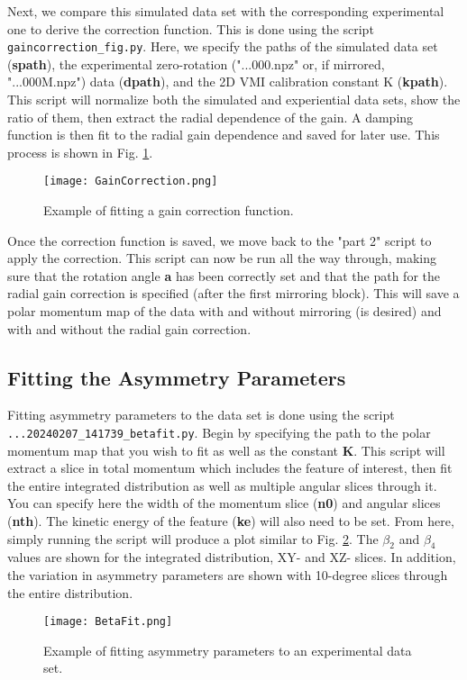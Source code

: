 \documentclass[12pt]{article}
\begin{document}
Next, we compare this simulated data set with the corresponding experimental one to derive the correction function.
This is done using the script \texttt{gaincorrection\_fig.py}.
Here, we specify the paths of the simulated data set (\textbf{spath}), the experimental zero-rotation ("...000.npz" or, if mirrored, "...000M.npz") data (\textbf{dpath}), and the 2D VMI calibration constant K (\textbf{kpath}).
This script will normalize both the simulated and experiential data sets, show the ratio of them, then extract the radial dependence of the gain.
A damping function is then fit to the radial gain dependence and saved for later use.
This process is shown in Fig. \ref{fig:GainCorrection}.

\begin{figure}
\centering
\texttt{[image: GainCorrection.png]}
\caption{
Example of fitting a gain correction function.
}\label{fig:GainCorrection}
\end{figure}

Once the correction function is saved, we move back to the "part 2" script to apply the correction.
This script can now be run all the way through, making sure that the rotation angle \textbf{a} has been correctly set and that the path for the radial gain correction is specified (after the first mirroring block).
This will save a polar momentum map of the data with and without mirroring (is desired) and with and without the radial gain correction.

\subsection{Fitting the Asymmetry Parameters}

Fitting asymmetry parameters to the data set is done using the script \texttt{...20240207\_141739\_betafit.py}.
Begin by specifying the path to the polar momentum map that you wish to fit as well as the constant \textbf{K}.
This script will extract a slice in total momentum which includes the feature of interest, then fit the entire integrated distribution as well as multiple angular slices through it.
You can specify here the width of the momentum slice (\textbf{n0}) and angular slices (\textbf{nth}).
The kinetic energy of the feature (\textbf{ke}) will also need to be set.
From here, simply running the script will produce a plot similar to Fig. \ref{fig:BetaFit}.
The $\beta_2$ and $\beta_4$ values are shown for the integrated distribution, XY- and XZ- slices.
In addition, the variation in asymmetry parameters are shown with 10-degree slices through the entire distribution.

\begin{figure}
\centering
\texttt{[image: BetaFit.png]}
\caption{
Example of fitting asymmetry parameters to an experimental data set.
}\label{fig:BetaFit}
\end{figure}
\end{document}

